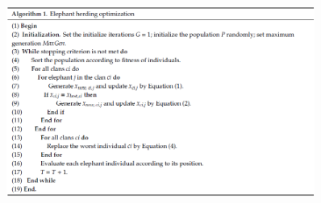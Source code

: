 \begin{figure}[ht]
    \begin{center}
        \includegraphics[width=0.9\textwidth]{assets/img/eho_pseudocode.PNG}
        \caption[EHO Pseudocode]{\cite[Li et al, S.5]{li_lei_alavi_wang_2020}}
        \label{eho_pseudocode}
    \end{center}
\end{figure}